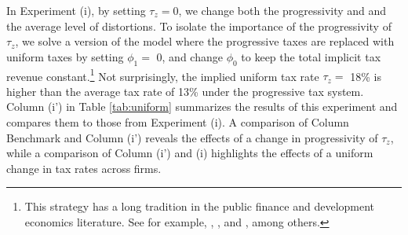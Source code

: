 \documentclass[AEJ]{AEA}
\begin{document}
In Experiment (i), by setting $\tau_z = 0$, we change both the progressivity and and the average level of distortions. To isolate the importance of the progressivity of $\tau_z$, we solve a version of the model where the progressive taxes are replaced with uniform taxes by setting $\phi_1 =$ 0, and change $\phi_0$ to keep the total implicit tax revenue constant.\footnote{This strategy has a long tradition in the public finance and development economics literature. See for example, \citet{Ventura:1999}, \citet{ConesaKrueger:2006}, \citet{Bhattacharyaetal:2013} and \citet{BentoRestuccia:2016}, among others.} Not surprisingly, the implied uniform tax rate $\tau_z =$ 18\% is higher than the average tax rate of 13\% under the progressive tax system. Column (i') in Table \ref{tab:uniform} summarizes the results of this experiment and compares them to those from Experiment (i). A comparison of Column Benchmark and Column (i') reveals the effects of a change in progressivity of $\tau_z$, while a comparison of Column (i') and (i) highlights the effects of a uniform change in tax rates across firms.
\end{document}
